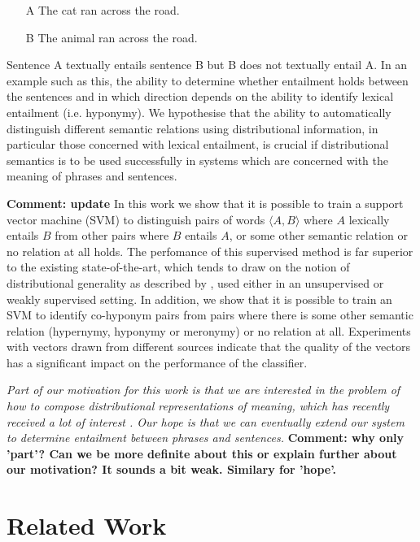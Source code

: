 \documentclass[11pt]{article}
\begin{document}
\begin{itemize}
\item[A]{The cat ran across the road.}
\item[B]{The animal ran across the road.}
\end{itemize}

Sentence A textually entails sentence B but B does not textually entail A. In an example such as this, the ability to determine whether entailment holds between the sentences and in which direction depends on the ability to identify lexical entailment (i.e. hyponymy). We hypothesise that the ability to automatically distinguish different semantic relations using distributional information, in particular those concerned with lexical entailment, is crucial if distributional semantics is to be used successfully in systems which are concerned with the meaning of phrases and sentences.

{\bf Comment: update} In this work we show that it is possible to train a support vector machine (SVM) to distinguish pairs of words $\langle A,B\rangle$ where $A$ lexically entails $B$ from other pairs where $B$ entails $A$, or some other semantic relation or no relation at all holds.  The perfomance of this supervised method is far superior to the existing state-of-the-art, which tends to draw on the notion of distributional generality as described by \cite{Weeds2004}, used either in an unsupervised or weakly supervised setting.  In addition, we show that it is possible to train an SVM to identify co-hyponym pairs from pairs where there is some other semantic relation (hypernymy, hyponymy or meronymy) or no relation at all. Experiments with vectors drawn from different sources indicate that the quality of the vectors has a significant impact on the performance of the classifier.

{\em Part of our motivation for this work is that we are interested in the
problem of how to compose distributional representations of meaning,
which has recently received a lot of interest
\cite{Widdows:08,Mitchell:08,Baroni2010,Grefenstette:11,Socher:12}. Our
hope is that we can eventually extend our system to determine
entailment between phrases and sentences.} {\bf Comment: why only 'part'? Can we be more definite about this or explain further about our motivation? It sounds a bit weak. Similary for 'hope'.}

\section{Related Work}
\end{document}
